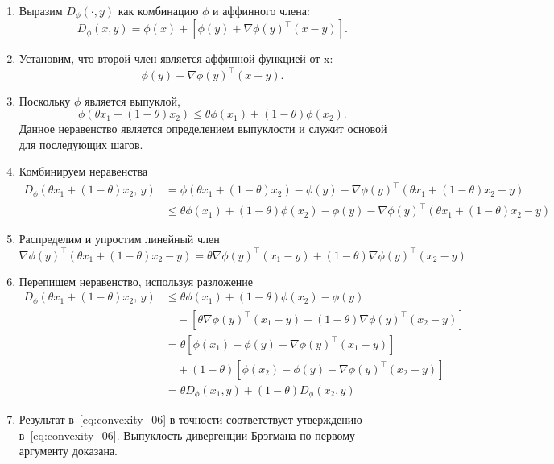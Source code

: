 \documentclass[12pt]{scrartcl}
\begin{document}
\begin{enumerate}
    \item Выразим $D_{\phi}(\cdot, y)$ как комбинацию $\phi$ и аффинного члена:
    \begin{equation}
        D_{\phi}(x,y) = \phi(x) + [\phi(y) + \nabla \phi(y)^{\top}(x - y)].
    \end{equation}
    \item Установим, что второй член является аффинной функцией от x:
    \begin{equation}
        \phi(y) + \nabla \phi (y)^{\top}(x - y).
    \end{equation}
    \item Поскольку $\phi$ является выпуклой,
    \begin{equation}
        \phi\left( \theta x_1 + (1 - \theta) x_2 \right) \leq \theta \phi(x_1) + (1 - \theta) \phi(x_2).
    \end{equation}
    Данное неравенство является определением выпуклости и служит основой для последующих шагов.
    \item Комбинируем неравенства
    \begin{equation}
        \begin{split}
            D_{\phi}(\theta x_1 + (1 - \theta) x_2,\, y) &= \phi\left( \theta x_1 + (1 - \theta) x_2 \right) - \phi(y) - \nabla \phi(y)^\top \left( \theta x_1 + (1 - \theta) x_2 - y \right) \\ &\leq \theta \phi(x_1) + (1 - \theta) \phi(x_2) - \phi(y) - \nabla \phi(y)^\top \left( \theta x_1 + (1 - \theta) x_2 - y \right)
        \end{split}
    \end{equation}
    \item Распределим и упростим линейный член
    \begin{equation}
        \nabla \phi(y)^\top \left( \theta x_1 + (1 - \theta) x_2 - y \right) = \theta \nabla \phi(y)^\top (x_1 - y) + (1 - \theta) \nabla \phi(y)^\top (x_2 - y)
    \end{equation}
    \item Перепишем неравенство, используя разложение
    \begin{equation}\label{eq:convexity_06}
        \begin{split}
            D_{\phi}(\theta x_1 + (1 - \theta) x_2,\, y) &\leq \theta \phi(x_1) + (1 - \theta) \phi(x_2) - \phi(y) \\
            &\quad - \left[ \theta \nabla \phi(y)^\top (x_1 - y) + (1 - \theta) \nabla \phi(y)^\top (x_2 - y) \right] \\
            &= \theta \left[ \phi(x_1) - \phi(y) - \nabla \phi(y)^\top (x_1 - y) \right] \\
            &\quad + (1 - \theta) \left[ \phi(x_2) - \phi(y) - \nabla \phi(y)^\top (x_2 - y) \right] \\
            &= \theta D_{\phi}(x_1, y) + (1 - \theta) D_{\phi}(x_2, y)
        \end{split}
    \end{equation}
    \item Результат в~\ref{eq:convexity_06} в точности соответствует утверждению в~\ref{eq:convexity_06}. Выпуклость дивергенции Брэгмана по первому аргументу доказана.
\end{enumerate}
\end{document}
